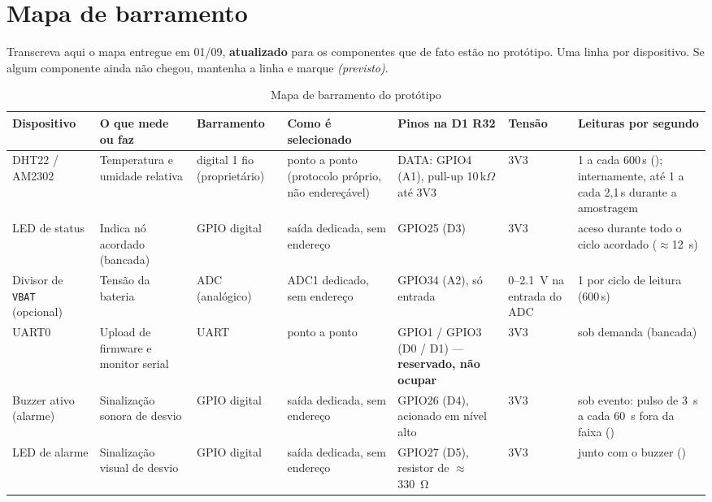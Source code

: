 \chapter{Mapa de barramento}
\label{ap:barramento}

\begin{orientacao}
Transcreva aqui o mapa entregue em 01/09, \textbf{atualizado} para os
componentes que de fato estão no protótipo. Uma linha por dispositivo.
Se algum componente ainda não chegou, mantenha a linha e marque
\emph{(previsto)}.
\end{orientacao}

\begin{table}[H]
\centering
\caption{Mapa de barramento do protótipo}
\label{tab:barramento}
\scriptsize
\setlength{\tabcolsep}{3.5pt}
\begin{tabular}{@{}L{2.4cm}L{3.0cm}L{1.5cm}L{2.5cm}L{2.4cm}C{1.0cm}C{1.6cm}@{}}
\toprule
\textbf{Dispositivo} & \textbf{O que mede ou faz} & \textbf{Barra\-mento}
& \textbf{Como é selecionado} & \textbf{Pinos na D1 R32} & \textbf{Ten\-são}
& \textbf{Leituras por segundo} \\
\midrule
DHT22 / AM2302 & Temperatura e umidade relativa & digital 1 fio (proprietário) & ponto a ponto (protocolo próprio, não endereçável) & DATA: GPIO4 (A1), pull-up 10\,k$\Omega$ até 3V3 & 3V3 & 1 a cada 600\,s (); internamente, até 1 a cada 2,1\,s durante a amostragem \\
LED de status & Indica nó acordado (bancada) & GPIO digital & saída dedicada, sem endereço & GPIO25 (D3) & 3V3 & aceso durante todo o ciclo acordado ($\approx$\SI{12}{\second}) \\
Divisor de \texttt{VBAT} (opcional) & Tensão da bateria & ADC (analógico) & ADC1 dedicado, sem endereço & GPIO34 (A2), só entrada & 0--\SI{2.1}{\volt} na entrada do ADC & 1 por ciclo de leitura (600\,s) \\
UART0 & Upload de firmware e monitor serial & UART & ponto a ponto & GPIO1 / GPIO3 (D0 / D1) --- \textbf{reservado, não ocupar} & 3V3 & sob demanda (bancada) \\
Buzzer ativo (alarme) & Sinalização sonora de desvio & GPIO digital & saída dedicada, sem endereço & GPIO26 (D4), acionado em nível alto & 3V3 & sob evento: pulso de \SI{3}{\second} a cada \SI{60}{\second} fora da faixa () \\
LED de alarme & Sinalização visual de desvio & GPIO digital & saída dedicada, sem endereço & GPIO27 (D5), resistor de $\approx$\SI{330}{\ohm} & 3V3 & junto com o buzzer () \\
\bottomrule
\end{tabular}
\end{table}

